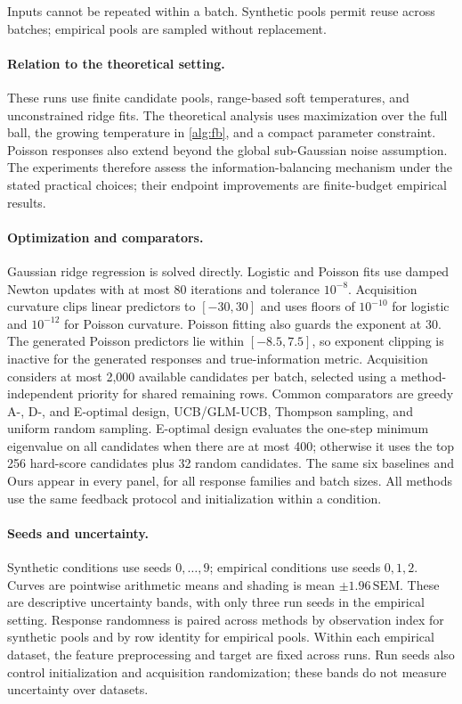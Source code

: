 \documentclass[10pt,twoside,letterpaper]{article}
\begin{document}
Inputs cannot be repeated within a batch.
Synthetic pools permit reuse across batches; empirical
pools are sampled without replacement.

\paragraph{Relation to the theoretical setting.}
These runs use finite candidate pools, range-based soft temperatures,
and unconstrained ridge fits. The theoretical analysis uses maximization
over the full ball, the growing temperature in \cref{alg:fb}, and a
compact parameter constraint. Poisson responses also extend beyond
the global sub-Gaussian noise assumption. The experiments therefore
assess the information-balancing mechanism under the stated practical
choices; their endpoint improvements are finite-budget empirical results.

\paragraph{Optimization and comparators.}
Gaussian ridge regression is solved directly. Logistic and Poisson
fits use damped Newton updates with at most 80 iterations and tolerance
$10^{-8}$. Acquisition curvature clips linear predictors to $[-30,30]$
and uses floors of $10^{-10}$ for logistic and $10^{-12}$ for Poisson
curvature. Poisson fitting also guards the exponent at 30. The
generated Poisson predictors lie within $[-8.5,7.5]$, so exponent
clipping is inactive for the generated responses and true-information
metric. Acquisition considers at most 2,000 available candidates per
batch, selected using a method-independent priority for shared remaining
rows. Common comparators are greedy A-, D-, and E-optimal design,
UCB/GLM-UCB, Thompson sampling, and uniform random sampling. E-optimal
design evaluates the one-step minimum eigenvalue on all candidates when
there are at most 400; otherwise it uses the top 256 hard-score candidates
plus 32 random candidates. The same six baselines and Ours appear in
every panel, for all response families and batch sizes. All methods
use the same feedback protocol and initialization within a condition.

\paragraph{Seeds and uncertainty.}
Synthetic conditions use seeds $0,\ldots,9$; empirical conditions use
seeds $0,1,2$. Curves are pointwise arithmetic means and shading is
mean $\pm1.96\,\mathrm{SEM}$. These are descriptive uncertainty bands,
with only three run seeds in the empirical setting. Response
randomness is paired across methods by observation index for synthetic
pools and by row identity for empirical pools. Within each empirical
dataset, the feature preprocessing and target are fixed across runs.
Run seeds also control initialization and acquisition randomization;
these bands do not measure uncertainty over datasets.
\end{document}
